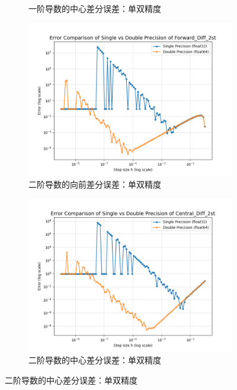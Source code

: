 \documentclass[12pt, a4paper]{article}
\begin{document}
\begin{figure}[htbp]
\begin{subfigure}[b]{0.45\textwidth}
        \caption{一阶导数的中心差分误差：单双精度}
        \label{fig: ECC1}
    \end{subfigure}
    \vspace{0.5cm}
    \centering
    \begin{subfigure}[b]{0.45\textwidth} 
        \centering
        \includegraphics[width=\textwidth]{./pictures/Error Comparison of Single vs Double Precision of Forward_Diff_2st.png} 
        \caption{二阶导数的向前差分误差：单双精度}
        \label{fig: ECF2}
    \end{subfigure}
    \hfill
    \begin{subfigure}[b]{0.45\textwidth} 
        \centering
        \includegraphics[width=\textwidth]{./pictures/Error Comparison of Single vs Double Precision of Central_Diff_2st.png} 
        \caption{二阶导数的中心差分误差：单双精度}
        \label{fig: ECC2}
    \end{subfigure}
\end{figure}
\end{document}
